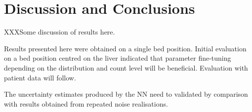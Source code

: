     


\section{Discussion and Conclusions} \label{sec:discussion_and_conclusions}
    XXXSome discussion of results here.

    Results presented here were obtained on a single bed position. Initial evaluation on a bed position centred on the liver indicated that parameter fine-tuning depending on the distribution and count level will be beneficial. Evaluation with patient data will follow.
    
    The uncertainty estimates produced by the \gls{NN} need to validated by comparison with results obtained from repeated noise realisations.
    
